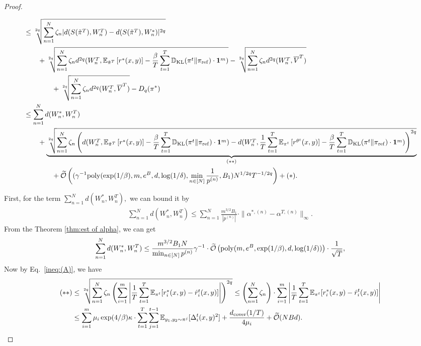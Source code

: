 \begin{proof}
\begin{small}
\begin{align*}
    &\le \sqrt[2q]{\sum_{n=1}^N \zeta_n |d(S(\tilde{\pi}^T), W_n^T) - d(S(\tilde{\pi}^T),W_n^*)|^{2q}}\\&\qquad +\sqrt[2q]{\sum_{n=1}^N\zeta_n d^{2q}(W_n^T, \mathbb{E}_{\tilde{\pi}^T}\left[r^*(x,y) \right]- \frac{\beta}{T}\sum_{t=1}^T \mathbb{D}_{\mathrm{KL}}(\pi^t\|\pi_{\mathrm{ref}})\cdot \mathbf{1}^m)} - \sqrt[2q]{\sum_{n=1}^N\zeta_n d^{2q}(W_n^T, \overline{V}^T)}\\
    &\qquad\qquad  + \sqrt[2q]{\sum_{n=1}^N \zeta_n d^{2q}(W_n^T, \overline{V}^T)} - D_q(\pi^*)\\
    &\le \sum_{n=1}^N d(W_n^*, W_n^T)
    \\&\qquad + \underbrace{\sqrt[2q]{\sum_{n=1}^N\zeta_n \left(d(W_n^T, \mathbb{E}_{\tilde{\pi}^T}\left[r^*(x,y) \right]- \frac{\beta}{T}\sum_{t=1}^T \mathbb{D}_{\mathrm{KL}}(\pi^t\|\pi_{\mathrm{ref}})\cdot \mathbf{1}^m)-d(W_n^T, \frac{1}{T}\sum_{t=1}^T\mathbb{E}_{\pi^t}\left[r^{\theta^t}(x,y) \right]- \frac{\beta}{T}\sum_{t=1}^T \mathbb{D}_{\mathrm{KL}}(\pi^t\|\pi_{\mathrm{ref}})\cdot \mathbf{1}^m)\right)^{2q}}}_{(\ast\ast)}\\&\qquad\qquad  + \widetilde{\mathcal{O}}\left((\gamma^{-1}\mathrm{poly}(\exp(1/\beta), m, e^B, d, \log(1/\delta), \min_{n \in [N]}\frac{1}{p^{(n)}}, B_1)N^{1/2q}T^{-1/2q}\right) + (\ast).
\end{align*}
\end{small}
First, for the term $\sum_{n=1}^N d(W_n^*, W_n^T),$ we can bound it by 
\begin{align*}
    \sum_{n=1}^N d(W_n^*, W_n^T) \le \sum_{n=1}^N \frac{m^{3/2}B_1}{|p^{(n)}|}\cdot \|\alpha^{*,(n)}-\alpha^{T,(n)}\|_\infty.
\end{align*}
From the Theorem \ref{thm:est of alpha}, we can get 
\begin{align}
    \sum_{n=1}^N d(W_n^*, W_n^T) \le \frac{m^{3/2}B_1N}{\min_{n \in [N]}p^{(n)}} \gamma^{-1} \cdot \widetilde{\mathcal{O}}\left(\mathrm{poly}(m,e^B,\exp(1/\beta), d,\log(1/\delta))\right)\cdot \frac{1}{\sqrt{T}},\label{eq:malfare online step 1}
\end{align}
Now by Eq.~\eqref{ineq:(A)}, we have
\begin{align}
    \mathrm{(\ast\ast)}&\le \sqrt[2q]{\sum_{n=1}^N \zeta_n \left(\sum_{i=1}^m\Bigg|\frac{1}{T}\sum_{t=1}^T \EE_{\pi^t}[r_i^*(x,y) -\hat{r}_i^t(x,y)]\Bigg|\right)^{2q}} \le \left(\sum_{n=1}^N \zeta_n\right)\cdot \sum_{i=1}^m\Bigg|\frac{1}{T}\sum_{t=1}^T  \EE_{\pi^t}[r_i^*(x,y) -\hat{r}_i^t(x,y)]\Bigg|\nonumber\\
    &\le \sum_{i=1}^m \mu_i \exp(4/\beta)\kappa\cdot \sum_{t=1}^T \sum_{j=1}^{t-1}\EE_{y_1,y_2\sim \pi^j}[\Delta_i^t(x,y)^2] + \frac{d_{\mathrm{cover}}(1/T)}{4\mu_i} + \widetilde{\cO}(NBd).\label{malfare online step 2}

\end{align}
\end{proof}
